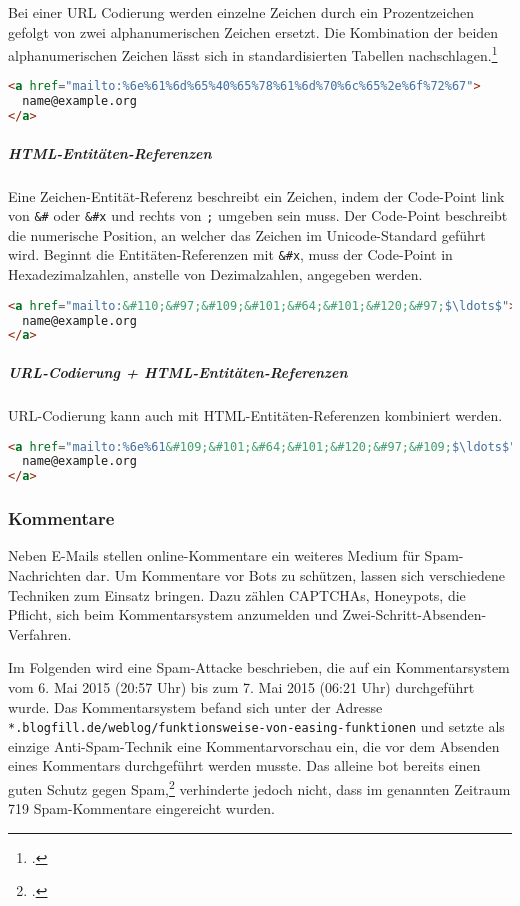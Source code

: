 Bei einer URL Codierung werden einzelne Zeichen durch ein Prozentzeichen
gefolgt von zwei alphanumerischen Zeichen ersetzt. Die Kombination der beiden
alphanumerischen Zeichen lässt sich in standardisierten Tabellen
nachschlagen.\footcite{rfc:3986}

\begin{lstlisting}[language=HTML]
<a href="mailto:%6e%61%6d%65%40%65%78%61%6d%70%6c%65%2e%6f%72%67">
  name@example.org
</a>
\end{lstlisting}

\subparagraph{HTML-Entitäten-Referenzen}
\label{spar:html-entitaeten-referenzen}

Eine Zeichen-Entität-Referenz beschreibt ein Zeichen, indem der Code-Point link
von \texttt{\&\#} oder \texttt{\&\#x} und rechts von \texttt{;} umgeben sein
muss. Der Code-Point beschreibt die numerische Position, an welcher das Zeichen
im Unicode-Standard geführt wird. Beginnt die Entitäten-Referenzen mit
\texttt{\&\#x}, muss der Code-Point in Hexadezimalzahlen, anstelle von
Dezimalzahlen, angegeben werden.

\begin{lstlisting}[language=HTML,escapechar=\$]
<a href="mailto:&#110;&#97;&#109;&#101;&#64;&#101;&#120;&#97;$\ldots$">
  name@example.org
</a>
\end{lstlisting}

\subparagraph{URL-Codierung + HTML-Entitäten-Referenzen}
\label{spar:url-codierung-html-entitaeten-referenzen}

URL-Codierung kann auch mit HTML-Entitäten-Referenzen kombiniert werden.

\begin{lstlisting}[language=HTML,escapechar=\$]
<a href="mailto:%6e%61&#109;&#101;&#64;&#101;&#120;&#97;&#109;$\ldots$">
  name@example.org
</a>
\end{lstlisting}

\subsubsection{Kommentare}
\label{ssub:kommentare}

Neben E-Mails stellen online-Kommentare ein weiteres Medium für
Spam-Nachrichten dar. Um Kommentare vor Bots zu schützen, lassen sich
verschiedene Techniken zum Einsatz bringen. Dazu zählen
CAPTCHAs, Honeypots, die Pflicht,
sich beim Kommentarsystem anzumelden und Zwei-Schritt-Absenden-Verfahren.

Im Folgenden wird eine Spam-Attacke beschrieben, die auf ein Kommentarsystem
vom 6. Mai 2015 (20:57 Uhr) bis zum 7. Mai 2015 (06:21 Uhr) durchgeführt wurde.
Das Kommentarsystem befand sich unter der Adresse
\texttt{*.blogfill.de/weblog/funktionsweise-von-easing-funktionen} und setzte
als einzige Anti-Spam-Technik eine Kommentarvorschau ein, die vor dem Absenden
eines Kommentars durchgeführt werden musste. Das alleine bot bereits einen
guten Schutz gegen Spam,\footcite{howSkipCommentPreview} verhinderte jedoch
nicht, dass im genannten Zeitraum 719 Spam-Kommentare eingereicht wurden.

